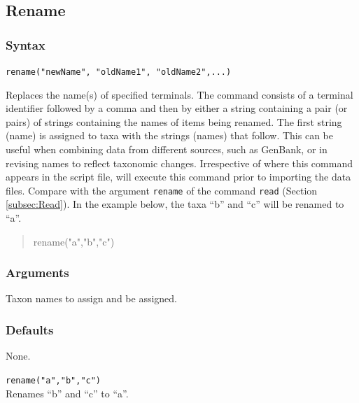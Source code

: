 \subsection{Rename}
	\label{subsec:Rename}
	\subsubsection{Syntax}
		\texttt{rename("newName", "oldName1", "oldName2",...)}
		
	\begin{phygdescription}
	{Replaces the name(s) of specified terminals. 
	The command consists of a terminal identifier followed by a comma and then by either 
	a string containing a pair (or pairs) of strings containing the names of items being renamed.
	The first string (name) is assigned to taxa with the strings (names) that follow. This can be 
	useful when combining data from different sources, such as GenBank, or in revising names 
	to reflect taxonomic changes. Irrespective of where this command appears in the script file, 
	\phyg will execute this command prior to importing the data files. Compare with the 
	argument \texttt{rename} of the command \texttt{read} (Section \ref{subsec:Read}).
	In the example below, the taxa ``b'' and ``c'' will be renamed to ``a''.

	\begin{quote}
	rename("a","b","c")
	\end{quote}}
	\end{phygdescription}
	
	\subsubsection{Arguments}
		Taxon names to assign and be assigned.
		
	\subsubsection{Defaults}
		None.
		
	\begin{example}
	
		\item{\texttt{rename("a","b","c")}\\ Renames ``b'' and ``c'' to ``a''. }
				
	\end{example}


